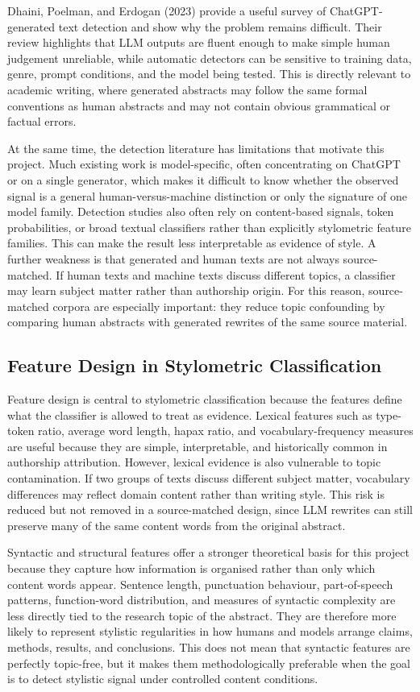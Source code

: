 \documentclass[12pt,a4paper]{article}
\begin{document}
Dhaini, Poelman, and Erdogan (2023) provide a useful survey of ChatGPT-generated text detection and show why the problem remains difficult. Their review highlights that LLM outputs are fluent enough to make simple human judgement unreliable, while automatic detectors can be sensitive to training data, genre, prompt conditions, and the model being tested. This is directly relevant to academic writing, where generated abstracts may follow the same formal conventions as human abstracts and may not contain obvious grammatical or factual errors.

At the same time, the detection literature has limitations that motivate this project. Much existing work is model-specific, often concentrating on ChatGPT or on a single generator, which makes it difficult to know whether the observed signal is a general human-versus-machine distinction or only the signature of one model family. Detection studies also often rely on content-based signals, token probabilities, or broad textual classifiers rather than explicitly stylometric feature families. This can make the result less interpretable as evidence of style. A further weakness is that generated and human texts are not always source-matched. If human texts and machine texts discuss different topics, a classifier may learn subject matter rather than authorship origin. For this reason, source-matched corpora are especially important: they reduce topic confounding by comparing human abstracts with generated rewrites of the same source material.

\subsection{Feature Design in Stylometric Classification}

Feature design is central to stylometric classification because the features define what the classifier is allowed to treat as evidence. Lexical features such as type-token ratio, average word length, hapax ratio, and vocabulary-frequency measures are useful because they are simple, interpretable, and historically common in authorship attribution. However, lexical evidence is also vulnerable to topic contamination. If two groups of texts discuss different subject matter, vocabulary differences may reflect domain content rather than writing style. This risk is reduced but not removed in a source-matched design, since LLM rewrites can still preserve many of the same content words from the original abstract.

Syntactic and structural features offer a stronger theoretical basis for this project because they capture how information is organised rather than only which content words appear. Sentence length, punctuation behaviour, part-of-speech patterns, function-word distribution, and measures of syntactic complexity are less directly tied to the research topic of the abstract. They are therefore more likely to represent stylistic regularities in how humans and models arrange claims, methods, results, and conclusions. This does not mean that syntactic features are perfectly topic-free, but it makes them methodologically preferable when the goal is to detect stylistic signal under controlled content conditions.
\end{document}
